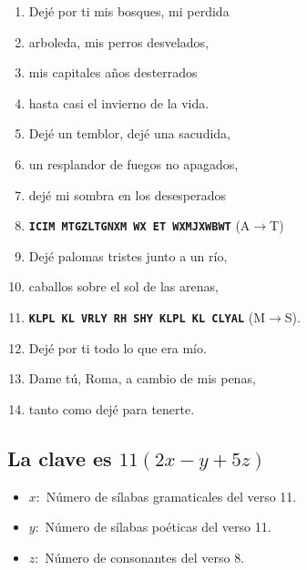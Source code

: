 \documentclass[a4paper,12pt]{article}
\begin{document}
\begin{enumerate}
  \item Dejé por ti mis bosques, mi perdida
  \item arboleda, mis perros desvelados,
  \item mis capitales años desterrados
  \item hasta casi el invierno de la vida.

  \item Dejé un temblor, dejé una sacudida,
  \item un resplandor de fuegos no apagados,
  \item dejé mi sombra en los desesperados
	\item \textbf{\texttt{ICIM MTGZLTGNXM WX ET WXMJXWBWT}} (A$\to$T)

  \item Dejé palomas tristes junto a un río,
  \item caballos sobre el sol de las arenas,
	\item \textbf{\texttt{KLPL KL VRLY RH SHY KLPL KL CLYAL}} (M$\to$S).

  \item Dejé por ti todo lo que era mío.
  \item Dame tú, Roma, a cambio de mis penas,
  \item tanto como dejé para tenerte.
\end{enumerate}
\subsection*{La clave es $11(2x-y + 5z)$}
\begin{itemize}
	\item $x:$ Número de sílabas gramaticales del verso 11.
	\item $y:$ Número de sílabas poéticas del verso 11.
	\item $z:$ Número de consonantes del verso 8.
\end{itemize}
\end{document}
